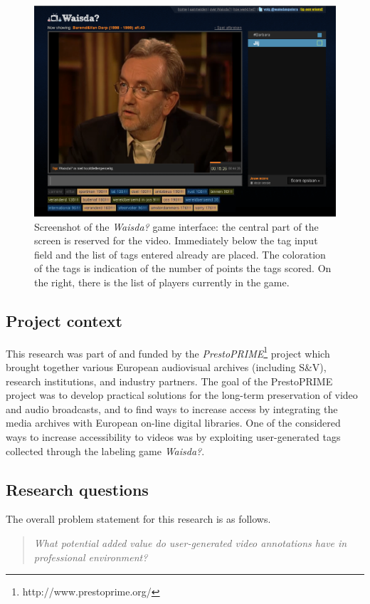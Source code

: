 \begin{footnotesize}
\begin{figure}[t!]
\centering
\includegraphics[scale=0.5]{intro:waisda_game}
\caption{Screenshot of the \textit{Waisda?} game interface: the central part of the screen is reserved for the video. Immediately below the tag input field and the list of tags entered already are placed. The coloration of the tags is indication of the number of points the tags scored.  On the right, there is the list of players currently in the game.}
\label{fig:waisda}
\end{figure}
\end{footnotesize}

\subsection{Project context}
This research was part of and funded by the \textit{PrestoPRIME}\footnote{http://www.prestoprime.org/} project which brought together various European audiovisual archives (including S\&V), research institutions, and industry partners. The goal of the PrestoPRIME project was to develop practical solutions for the long-term preservation of video and audio broadcasts, and to find ways to increase access by integrating the media archives with European on-line digital libraries. One of the considered ways to increase accessibility to videos was by exploiting user-generated tags collected through the labeling game \textit{Waisda?}.

\subsection{Research questions}\label{sec:research-questions}
The overall problem statement for this research is as follows.
\begin{quote}
\textit{What potential added value do user-generated video annotations have in professional environment?}
\end{quote}

